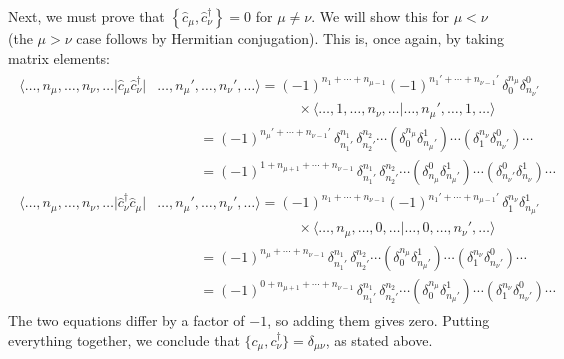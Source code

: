 \documentclass[pra,12pt]{revtex4}
\begin{document}
Next, we must prove that $\left\{ \hat{c}_\mu,
\hat{c}_\nu^\dagger\right\} = 0$ for $\mu \ne \nu$.  We will show this
for $\mu < \nu$ (the $\mu > \nu$ case follows by Hermitian
conjugation).  This is, once again, by taking matrix elements:
\begin{align*}
  \begin{aligned}\big\langle \dots,n_\mu,\dots, n_\nu,\dots \big| \hat{c}_\mu \hat{c}_\nu^\dagger \big| & \dots, n_\mu', \dots, n_\nu',\dots\big\rangle = (-1)^{n_1+\cdots+n_{\mu-1}} (-1)^{n_1'+\cdots+n_{\nu-1}'} \,\delta^{n_\mu}_0 \delta^0_{n_\nu'} \\ &\qquad\qquad\qquad\qquad\qquad\times \big\langle \dots, 1, \dots, n_\nu,\dots\big| \dots,n_{\mu}', \dots,1, \dots \big\rangle \\ &\qquad\quad = (-1)^{n_\mu'+\cdots+n_{\nu-1}'}\, \delta^{n_1}_{n_1'} \, \delta^{n_2}_{n_2'} \cdots \left(\delta^{n_\mu}_0\delta^1_{n_\mu'}\right) \cdots \left(\delta^{n_\nu}_1 \delta^0_{n_\nu'}\right) \cdots \\
&\qquad\quad = (-1)^{1 + n_{\mu+1} + \cdots+n_{\nu-1}}\, \delta^{n_1}_{n_1'} \, \delta^{n_2}_{n_2'} \cdots \left(\delta^0_{n_\mu}\delta^1_{n_\mu'}\right) \cdots \left(\delta^0_{n_\nu'} \delta^1_{n_\nu}\right) \cdots \\
  \big\langle \dots,n_\mu,\dots, n_\nu,\dots \big| \hat{c}_\nu^\dagger \hat{c}_\mu \big| &\dots, n_\mu', \dots, n_\nu',\dots\big\rangle = (-1)^{n_1+\cdots+n_{\nu-1}} (-1)^{n_1'+\cdots+n_{\mu-1}'} \,\delta^{n_\nu}_1 \delta^1_{n_\mu'} \\ &\qquad\qquad\qquad\qquad\qquad\times \big\langle \dots, n_\mu, \dots, 0,\dots\big| \dots,0, \dots,n_\nu', \dots \big\rangle \\ &\qquad\quad= (-1)^{n_{\mu}+\cdots+n_{\nu-1}}\, \delta^{n_1}_{n_1'} \, \delta^{n_2}_{n_2'} \cdots \left(\delta^{n_\mu}_0\delta^1_{n_\mu'}\right) \cdots \left(\delta^{n_\nu}_1 \delta^0_{n_\nu'} \right) \cdots \\ &\qquad\quad= (-1)^{0 + n_{\mu+1}+\cdots+n_{\nu-1}}\, \delta^{n_1}_{n_1'} \, \delta^{n_2}_{n_2'} \cdots \left(\delta^{n_\mu}_0\delta^1_{n_\mu'}\right) \cdots \left(\delta^{n_\nu}_1\delta^0_{n_\nu'}\right) \cdots
  \end{aligned}
\end{align*}
The two equations differ by a factor of $-1$, so adding them gives
zero.  Putting everything together, we conclude that
$\big\{c_\mu,c_\nu^\dagger\big\} = \delta_{\mu\nu}$, as stated above.
\end{document}
